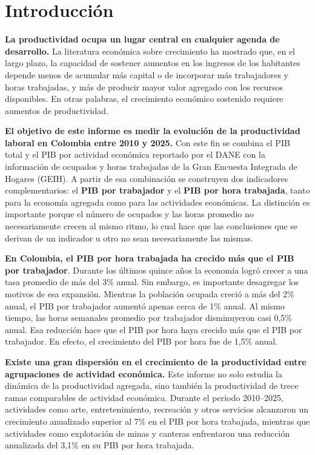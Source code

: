 \section{Introducción}

\textbf{La productividad ocupa un lugar central en cualquier agenda de desarrollo.} La literatura económica sobre crecimiento ha mostrado que, en el largo plazo, la capacidad de sostener aumentos en los ingresos de los habitantes depende menos de acumular más capital o de incorporar más trabajadores y horas trabajadas, y más de producir mayor valor agregado con los recursos disponibles. En otras palabras, el crecimiento económico sostenido requiere aumentos de productividad.

\textbf{El objetivo de este informe es medir la evolución de la productividad laboral en Colombia entre 2010 y 2025.} Con este fin se combina el PIB total y el PIB por actividad económica reportado por el DANE con la información de ocupados y horas trabajadas de la Gran Encuesta Integrada de Hogares (GEIH). A partir de esa combinación se construyen dos indicadores complementarios: el \textbf{PIB por trabajador} y el \textbf{PIB por hora trabajada}, tanto para la economía agregada como para las actividades económicas. La distinción es importante porque el número de ocupados y las horas promedio no necesariamente crecen al mismo ritmo, lo cual hace que las conclusiones que se derivan de un indicador u otro no sean necesariamente las mismas.

\textbf{En Colombia, el PIB por hora trabajada ha crecido más que el PIB por trabajador}. Durante los últimos quince años la economía logró crecer a una tasa promedio de más del 3\% anual. Sin embargo, es importante desagregar los motivos de esa expansión. Mientras la población ocupada creció a más del 2\% anual, el PIB por trabajador aumentó apenas cerca de 1\% anual. Al mismo tiempo, las horas semanales promedio por trabajador disminuyeron casi 0,5\% anual. Esa reducción hace que el PIB por hora haya crecido más que el PIB por trabajador. En efecto, el crecimiento del PIB por hora fue de 1,5\% anual.

\textbf{Existe una gran dispersión en el crecimiento de la productividad entre agrupaciones de actividad económica.} Este informe no solo estudia la dinámica de la productividad agregada, sino también la productividad de trece ramas comparables de actividad económica. Durante el periodo 2010--2025, actividades como arte, entretenimiento, recreación y otros servicios alcanzaron un crecimiento anualizado superior al 7\% en el PIB por hora trabajada, mientras que actividades como explotación de minas y canteras enfrentaron una reducción anualizada del 3,1\% en su PIB por hora trabajada.

